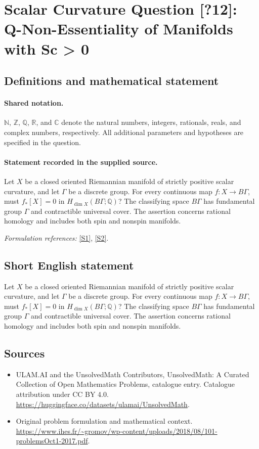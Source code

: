 \documentclass[11pt]{article}
\newcommand{\sref}[2]{\hyperlink{source:#1:#2}{[S#2]}}
\begin{document}
\section{Scalar Curvature Question [?12]: Q-Non-Essentiality of Manifolds with Sc > 0}\label{statement}

\subsection{Definitions and mathematical statement}

\paragraph{Shared notation.}$\mathbb N$, $\mathbb Z$, $\mathbb Q$, $\mathbb R$, and $\mathbb C$ denote the natural numbers, integers, rationals, reals, and complex numbers, respectively. All additional parameters and hypotheses are specified in the question.


\paragraph{Statement recorded in the supplied source.}
Let $X$ be a closed oriented Riemannian manifold of strictly positive scalar curvature, and let $\Gamma$ be a discrete group. For every continuous map $f:X\to B\Gamma$, must $f_*[X]=0$ in $H_{\dim X}(B\Gamma;\mathbb Q)$? The classifying space $B\Gamma$ has fundamental group $\Gamma$ and contractible universal cover. The assertion concerns rational homology and includes both spin and nonspin manifolds.
\par\smallskip\textit{Formulation references:} \sref{statement}{1}, \sref{statement}{2}.
\subsection{Short English statement}
Let $X$ be a closed oriented Riemannian manifold of strictly positive scalar curvature, and let $\Gamma$ be a discrete group. For every continuous map $f:X\to B\Gamma$, must $f_*[X]=0$ in $H_{\dim X}(B\Gamma;\mathbb Q)$? The classifying space $B\Gamma$ has fundamental group $\Gamma$ and contractible universal cover. The assertion concerns rational homology and includes both spin and nonspin manifolds.
\subsection{Sources}
\begin{itemize}
\item[\hypertarget{source:statement:1}{S1}] ULAM.AI and the UnsolvedMath Contributors, UnsolvedMath: A Curated Collection of Open Mathematics Problems, catalogue entry. Catalogue attribution under CC BY 4.0.
\url{https://huggingface.co/datasets/ulamai/UnsolvedMath}.
\item[\hypertarget{source:statement:2}{S2}] Original problem formulation and mathematical context.
\url{https://www.ihes.fr/~gromov/wp-content/uploads/2018/08/101-problemsOct1-2017.pdf}.
\end{itemize}
\label{end:statement}
\end{document}

